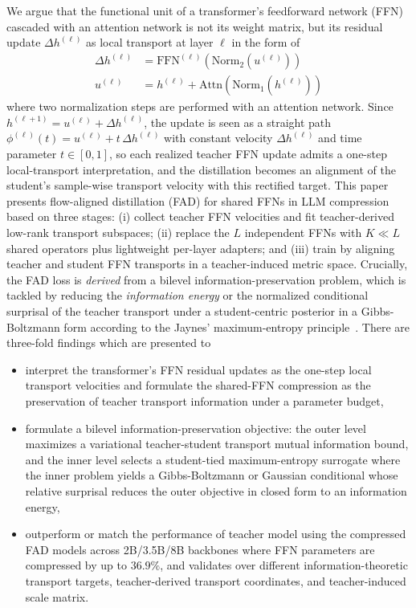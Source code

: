 \documentclass[letterpaper]{article} %
\newcommand{\Attn}{\mathrm{Attn}}
\newcommand{\Norm}{\mathrm{Norm}}
\newcommand{\FFN}{\mathrm{FFN}}
\theoremstyle{plain}
\theoremstyle{definition}
\begin{document}
We argue that the functional unit of a transformer's feedforward network (FFN) cascaded with an attention network is not its weight matrix, but its residual update $\Delta h^{(\ell)}$ as local transport at layer $\ell$ in the form of
\begin{align}
\Delta h^{(\ell)} &= \FFN^{(\ell)}(\Norm_2(u^{(\ell)})) \label{eq ffn}\\
u^{(\ell)} &= h^{(\ell)} + \Attn(\Norm_1(h^{(\ell)})) \label{eq att}
\end{align}
where two normalization steps are performed with an attention network. Since $h^{(\ell+1)}=u^{(\ell)}+\Delta h^{(\ell)}$, the update is seen as a straight path $\phi^{(\ell)}(t)=u^{(\ell)}+t\,\Delta h^{(\ell)}$ with constant velocity $\Delta h^{(\ell)}$ and time parameter $t\in[0,1]$, so each realized teacher FFN update admits a one-step local-transport interpretation, and the distillation becomes an alignment of the student's sample-wise transport velocity with this rectified target. This paper presents flow-aligned distillation (FAD) for shared FFNs in LLM compression based on three stages: (i) collect teacher FFN velocities and fit teacher-derived low-rank transport subspaces; (ii) replace the $L$ independent FFNs with $K\ll L$ shared operators plus lightweight per-layer adapters; and (iii) train by aligning teacher and student FFN transports in a teacher-induced metric space. Crucially, the FAD loss is \emph{derived} from a bilevel information-preservation problem, which is tackled by reducing the \emph{information energy} or the normalized conditional surprisal of the teacher transport under a student-centric posterior in a Gibbs-Boltzmann form according to the Jaynes' maximum-entropy principle~\citep{jaynes1957information}. There are three-fold findings which are presented to
\begin{itemize}
\item[$-$] interpret the transformer's FFN residual updates as the one-step local transport velocities and formulate the shared-FFN compression as the preservation of teacher transport information under a parameter budget,
\item[$-$] formulate a bilevel information-preservation objective: the outer level maximizes a variational teacher-student transport mutual information bound, and the inner level selects a student-tied maximum-entropy surrogate where the inner problem yields a Gibbs-Boltzmann or Gaussian conditional whose relative surprisal reduces the outer objective in closed form to an information energy,
\item[$-$] outperform or match the performance of teacher model using the compressed FAD models across 2B/3.5B/8B backbones where FFN parameters are compressed by up to $36.9\%$, and validates over different information-theoretic transport targets, teacher-derived transport coordinates, and teacher-induced scale matrix.
\end{itemize}
\end{document}
